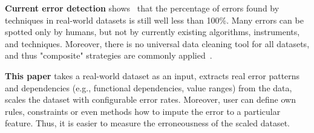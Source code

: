 \textbf{Current error detection} shows~\cite{errors, cleanml} that the percentage of errors found by techniques in real-world datasets is still well less than 100\%. 
Many errors can be spotted only by humans, but not by currently existing algorithms, instruments, and techniques.
Moreover, there is no universal data cleaning tool for all datasets, and thus "composite" strategies are commonly applied~\cite{errors}.

\textbf{This paper} takes a real-world dataset as an input, extracts real error patterns and dependencies (e.g., functional dependencies, value ranges) from the data, scales the dataset with configurable error rates. 
Moreover, user can define own rules, constraints or even methods how to impute the error to a particular feature.
Thus, it is easier to measure the erroneousness of the scaled dataset. 





